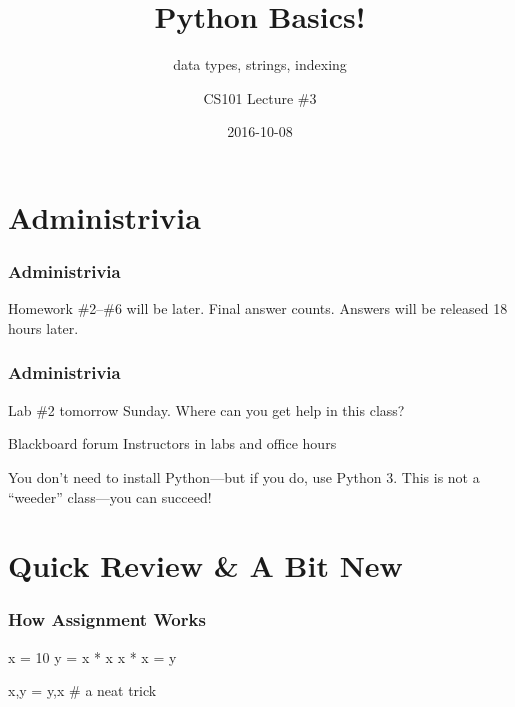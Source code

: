 \documentclass[11pt]{beamer}
\title{Python Basics!}
\subtitle{data types, strings, indexing}
\author{CS101 Lecture \#3}
\date{2016-10-08}
\begin{document}
  \setcounter{showProgressBar}{0}
  \setcounter{showSlideNumbers}{0}

\frame{\titlepage}

\setcounter{framenumber}{0}
\setcounter{showProgressBar}{1}
\setcounter{showSlideNumbers}{1}

\section{Administrivia}

\begin{frame}
  \frametitle{Administrivia}
  \Enlarge
  \begin{itemize}
  \mysubitem  Homework \#2--\#6 will be later. \pause
  \mysubitem  Final answer counts. \pause
  \mysubitem  Answers will be released 18 hours later.
  \end{itemize}
\end{frame}

\begin{frame}
  \frametitle{Administrivia}
  \Enlarge
  \begin{itemize}
  \myitem  Lab \#2 tomorrow Sunday. \pause
  \myitem  Where can you get help in this class?
    \begin{itemize}
    \mysubitem  Blackboard forum 
    \mysubitem  Instructors in labs and office hours 
    \end{itemize} \pause
  \myitem  You don't need to install Python---but if you do, use Python 3. \pause
  \myitem  This is not a ``weeder'' class---you can succeed!
  \end{itemize}
\end{frame}

\section{Quick Review \& A Bit New}

\begin{frame}[fragile]
  \frametitle{How Assignment Works}
  \Enlarge

  \begin{semiverbatim}
x = 10 \pause
y = x * x \pause
x * x = y \pause

x,y = y,x  # a neat trick
  \end{semiverbatim}
\end{frame}
\end{document}
